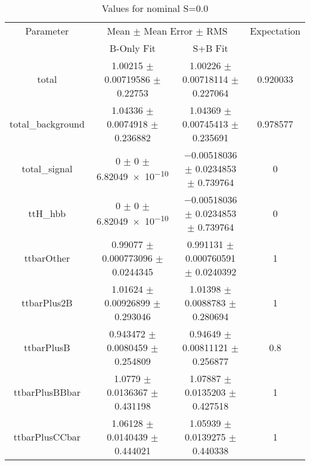 \begin{table}
\centering
\caption{Values for nominal S=0.0}
\begin{tabular}{cccc}
\toprule
Parameter & \multicolumn{2}{c}{Mean $\pm$ Mean Error $\pm$ RMS} & Expectation\\
 & B-Only Fit & S+B Fit & \\
\midrule
total & \num{1.00215} $\pm$ \num{0.00719586} $\pm$ \num{0.22753} & \num{1.00226} $\pm$ \num{0.00718114} $\pm$ \num{0.227064} & \num{0.920033}\\
total\_background & \num{1.04336} $\pm$ \num{0.0074918} $\pm$ \num{0.236882} & \num{1.04369} $\pm$ \num{0.00745413} $\pm$ \num{0.235691} & \num{0.978577}\\
total\_signal & \num{0} $\pm$ \num{0} $\pm$ \num{6.82049e-10} & \num{-0.00518036} $\pm$ \num{0.0234853} $\pm$ \num{0.739764} & \num{0}\\
ttH\_hbb & \num{0} $\pm$ \num{0} $\pm$ \num{6.82049e-10} & \num{-0.00518036} $\pm$ \num{0.0234853} $\pm$ \num{0.739764} & \num{0}\\
ttbarOther & \num{0.99077} $\pm$ \num{0.000773096} $\pm$ \num{0.0244345} & \num{0.991131} $\pm$ \num{0.000760591} $\pm$ \num{0.0240392} & \num{1}\\
ttbarPlus2B & \num{1.01624} $\pm$ \num{0.00926899} $\pm$ \num{0.293046} & \num{1.01398} $\pm$ \num{0.0088783} $\pm$ \num{0.280694} & \num{1}\\
ttbarPlusB & \num{0.943472} $\pm$ \num{0.0080459} $\pm$ \num{0.254809} & \num{0.94649} $\pm$ \num{0.00811121} $\pm$ \num{0.256877} & \num{0.8}\\
ttbarPlusBBbar & \num{1.0779} $\pm$ \num{0.0136367} $\pm$ \num{0.431198} & \num{1.07887} $\pm$ \num{0.0135203} $\pm$ \num{0.427518} & \num{1}\\
ttbarPlusCCbar & \num{1.06128} $\pm$ \num{0.0140439} $\pm$ \num{0.444021} & \num{1.05939} $\pm$ \num{0.0139275} $\pm$ \num{0.440338} & \num{1}\\
\bottomrule
\end{tabular}
\end{table}